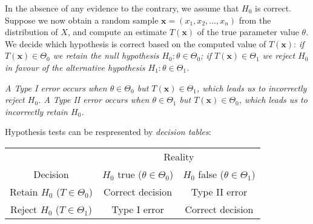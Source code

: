 In the absence of any evidence to the contrary, we assume that $H_0$ is correct. Suppose we now obtain a random sample $\mathbf{x}=(x_1,x_2,\ldots,x_n)$ from the distribution of $X$, and compute an estimate $T(\mathbf{x})$ of the true parameter value $\theta$. We decide which hypothesis is correct based on the computed value of $T(\mathbf{x})$:
\bit
\it if $T(\mathbf{x})\in\Theta_0$ we retain the null hypothesis $H_0:\theta\in\Theta_0$;
\it if $T(\mathbf{x})\in\Theta_1$ we reject $H_0$ in favour of the alternative hypothesis $H_1:\theta\in\Theta_1$.
\eit

\begin{definition}
\bit
\it A \emph{Type I error} occurs when $\theta\in\Theta_0$ but $T(\mathbf{x})\in\Theta_1$, which leads us to incorrectly reject $H_0$. 
\it A \emph{Type II error} occurs when $\theta\in\Theta_1$ but $T(\mathbf{x})\in\Theta_0$, which leads us to incorrectly retain $H_0$.
\eit
\end{definition}

Hypothesis tests can be respresented by \emph{decision tables}:
\begin{center}
\begin{tabular}{|c|c|c|} \hline
											& \multicolumn{2}{c|}{Reality} \\ 
Decision									& $H_0$ true ($\theta\in\Theta_0$)	& $H_0$ false ($\theta\in\Theta_1$) \\ \hline
Retain $H_0$ ($T\in\Theta_0$)	& Correct decision 					& Type II error \\ 
Reject $H_0$ ($T\in\Theta_1$)	& Type I error 						& Correct decision \\ \hline
\end{tabular}
\end{center}

